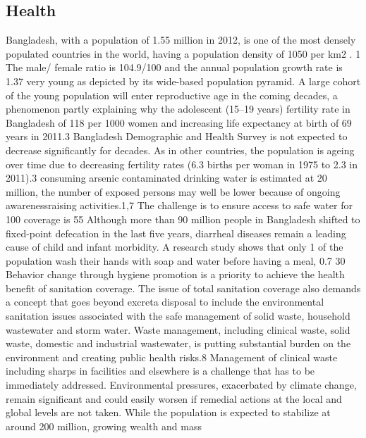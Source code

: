 \documentclass[a4paper,12pt]{article}
\begin{document}
\subsection{Health}
Bangladesh, with a population of 1.55 million in 2012, is
one of the most densely populated countries in the world,
having a population density of 1050 per km2
.
1 The male/
female ratio is 104.9/100 and the annual population
growth rate is 1.37%
very young as depicted by its wide-based population
pyramid. A large cohort of the young population will
enter reproductive age in the coming decades, a
phenomenon partly explaining why the adolescent (15–19
years) fertility rate in Bangladesh of 118 per 1000 women
and increasing life expectancy at birth of 69 years in
2011.3
Bangladesh Demographic and Health Survey is not
expected to decrease significantly for decades. As in other
countries, the population is ageing over time due to
decreasing fertility rates (6.3 births per woman in 1975 to
2.3 in 2011).3 consuming arsenic contaminated drinking water is
estimated at 20 million, the number of exposed persons
may well be lower because of ongoing awarenessraising activities.1,7 The challenge is to ensure access to
safe water for 100%
coverage is 55%
Although more than 90 million people in Bangladesh
shifted to fixed-point defecation in the last five years,
diarrheal diseases remain a leading cause of child and
infant morbidity. A research study shows that only 1%
of the population wash their hands with soap and water
before having a meal, 0.7%
30%
Behavior change through hygiene promotion is a
priority to achieve the health benefit of sanitation coverage. The issue of total sanitation coverage also demands
a concept that goes beyond excreta disposal to include
the environmental sanitation issues associated with the
safe management of solid waste, household wastewater
and storm water. Waste management, including clinical
waste, solid waste, domestic and industrial wastewater,
is putting substantial burden on the environment and
creating public health risks.8 Management of clinical
waste including sharps in facilities and elsewhere is a
challenge that has to be immediately addressed.
Environmental pressures, exacerbated by climate
change, remain significant and could easily worsen if
remedial actions at the local and global levels are not
taken. While the population is expected to stabilize at
around 200 million, growing wealth and mass
\end{document}
